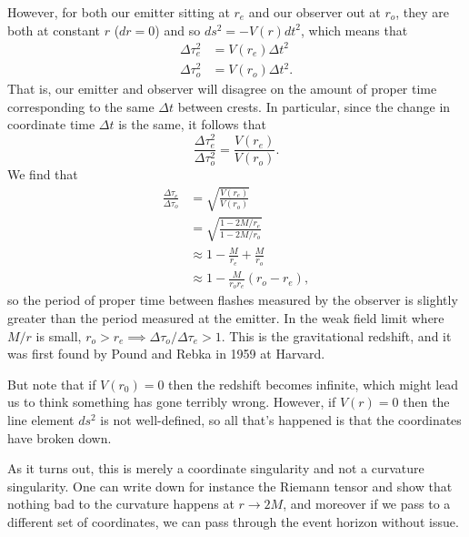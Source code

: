 However, for both our emitter sitting at $r_e$ and our observer out at $r_o$, they are both at constant $r$ ($dr=0$) and so $ds^2=-V(r) dt^2$, which means that
\begin{align*}
    \Delta \tau_e^2&=V(r_e)\Delta t^2\\
    \Delta \tau_o^2 &= V(r_o)\Delta t^2.
\end{align*}
That is, our emitter and observer will disagree on the amount of proper time corresponding to the same $\Delta t$ between crests. In particular, since the change in coordinate time $\Delta t$ is the same, it follows that $$\frac{\Delta \tau_e^2}{\Delta \tau_o^2}=\frac{V(r_e)}{V(r_o)}.$$
We find that
\begin{align*}
    \frac{\Delta \tau_e}{\Delta \tau_o}&=\sqrt{\frac{V(r_e)}{V(r_o)}}\\
    &=\sqrt{\frac{1-2M/r_e}{1-2M/r_o}}\\
    &\approx 1-\frac{M}{r_e}+\frac{M}{r_o}\\
    &\approx 1-\frac{M}{r_o r_e}(r_o-r_e),
\end{align*}
so the period of proper time between flashes measured by the observer is slightly greater than the period measured at the emitter. In the weak field limit where $M/r$ is small, $r_o>r_e \implies \Delta \tau_o/\Delta \tau_e > 1$. This is the gravitational redshift, and it was first found by Pound and Rebka in 1959 at Harvard.

But note that if $V(r_0)=0$ then the redshift becomes infinite, which might lead us to think something has gone terribly wrong. However, if $V(r)=0$ then the line element $ds^2$ is not well-defined, so all that's happened is that the coordinates have broken down. 

As it turns out, this is merely a coordinate singularity and not a curvature singularity. One can write down for instance the Riemann tensor and show that nothing bad to the curvature happens at $r\to 2M$, and moreover if we pass to a different set of coordinates, we can pass through the event horizon without issue.

